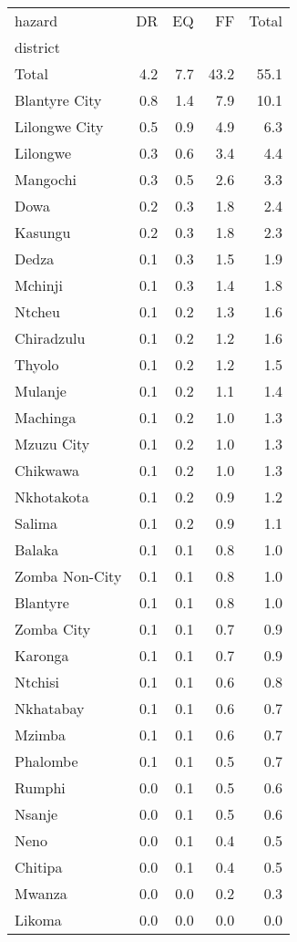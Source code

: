 \begin{tabular}{lrrrr}
\toprule
hazard &   DR &   EQ &    FF &  Total \\
district       &      &      &       &        \\
\midrule
Total          &  4.2 &  7.7 &  43.2 &   55.1 \\
Blantyre City  &  0.8 &  1.4 &   7.9 &   10.1 \\
Lilongwe City  &  0.5 &  0.9 &   4.9 &    6.3 \\
Lilongwe       &  0.3 &  0.6 &   3.4 &    4.4 \\
Mangochi       &  0.3 &  0.5 &   2.6 &    3.3 \\
Dowa           &  0.2 &  0.3 &   1.8 &    2.4 \\
Kasungu        &  0.2 &  0.3 &   1.8 &    2.3 \\
Dedza          &  0.1 &  0.3 &   1.5 &    1.9 \\
Mchinji        &  0.1 &  0.3 &   1.4 &    1.8 \\
Ntcheu         &  0.1 &  0.2 &   1.3 &    1.6 \\
Chiradzulu     &  0.1 &  0.2 &   1.2 &    1.6 \\
Thyolo         &  0.1 &  0.2 &   1.2 &    1.5 \\
Mulanje        &  0.1 &  0.2 &   1.1 &    1.4 \\
Machinga       &  0.1 &  0.2 &   1.0 &    1.3 \\
Mzuzu City     &  0.1 &  0.2 &   1.0 &    1.3 \\
Chikwawa       &  0.1 &  0.2 &   1.0 &    1.3 \\
Nkhotakota     &  0.1 &  0.2 &   0.9 &    1.2 \\
Salima         &  0.1 &  0.2 &   0.9 &    1.1 \\
Balaka         &  0.1 &  0.1 &   0.8 &    1.0 \\
Zomba Non-City &  0.1 &  0.1 &   0.8 &    1.0 \\
Blantyre       &  0.1 &  0.1 &   0.8 &    1.0 \\
Zomba City     &  0.1 &  0.1 &   0.7 &    0.9 \\
Karonga        &  0.1 &  0.1 &   0.7 &    0.9 \\
Ntchisi        &  0.1 &  0.1 &   0.6 &    0.8 \\
Nkhatabay      &  0.1 &  0.1 &   0.6 &    0.7 \\
Mzimba         &  0.1 &  0.1 &   0.6 &    0.7 \\
Phalombe       &  0.1 &  0.1 &   0.5 &    0.7 \\
Rumphi         &  0.0 &  0.1 &   0.5 &    0.6 \\
Nsanje         &  0.0 &  0.1 &   0.5 &    0.6 \\
Neno           &  0.0 &  0.1 &   0.4 &    0.5 \\
Chitipa        &  0.0 &  0.1 &   0.4 &    0.5 \\
Mwanza         &  0.0 &  0.0 &   0.2 &    0.3 \\
Likoma         &  0.0 &  0.0 &   0.0 &    0.0 \\
\bottomrule
\end{tabular}
